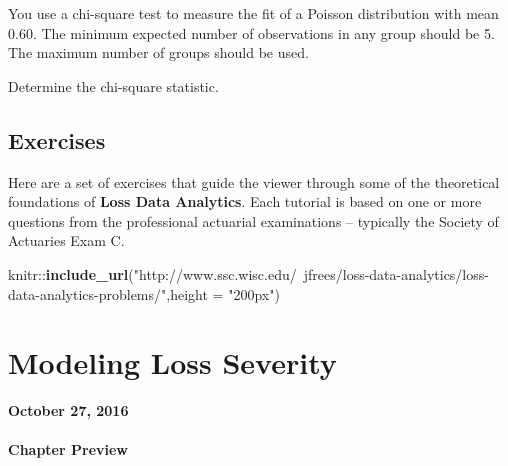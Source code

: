\documentclass[]{book}
\newenvironment{Shaded}{\begin{snugshade}}{\end{snugshade}}
\newcommand{\KeywordTok}[1]{\textcolor[rgb]{0.13,0.29,0.53}{\textbf{{#1}}}}
\newcommand{\DataTypeTok}[1]{\textcolor[rgb]{0.13,0.29,0.53}{{#1}}}
\newcommand{\StringTok}[1]{\textcolor[rgb]{0.31,0.60,0.02}{{#1}}}
\newcommand{\NormalTok}[1]{{#1}}
\theoremstyle{definition}
\theoremstyle{definition}
\theoremstyle{definition}
\theoremstyle{remark}
\begin{document}
You use a chi-square test to measure the fit of a Poisson distribution
with mean 0.60. The minimum expected number of observations in any group
should be 5. The maximum number of groups should be used.

Determine the chi-square statistic.

\section{Exercises}\label{exercises}

Here are a set of exercises that guide the viewer through some of the
theoretical foundations of \textbf{Loss Data Analytics}. Each tutorial
is based on one or more questions from the professional actuarial
examinations -- typically the Society of Actuaries Exam C.

\begin{Shaded}
\begin{Highlighting}[]
\NormalTok{knitr::}\KeywordTok{include_url}\NormalTok{(}\StringTok{"http://www.ssc.wisc.edu/~jfrees/loss-data-analytics/loss-data-analytics-problems/"}\NormalTok{,}\DataTypeTok{height =} \StringTok{"200px"}\NormalTok{)}
\end{Highlighting}
\end{Shaded}

\chapter{Modeling Loss Severity}\label{modeling-loss-severity}

\textbf{October 27, 2016}

\subsubsection*{Chapter Preview}\label{chapter-preview}
\end{document}
